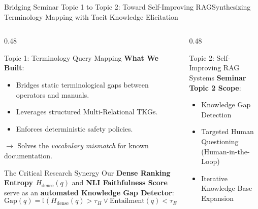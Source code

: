 \documentclass[aspectratio=169,10pt]{beamer}
\begin{document}
\begin{frame}{Bridging Seminar Topic 1 to Topic 2: Toward Self-Improving RAG}{Synthesizing Terminology Mapping with Tacit Knowledge Elicitation}
  \begin{columns}[T]
    \begin{column}{0.48\textwidth}
      \begin{block}{Topic 1: Terminology Query Mapping}
        \scriptsize
        \textbf{What We Built}:
        \begin{itemize}\setlength\itemsep{0.03ex}
          \item Bridges static terminological gaps between operators and manuals.
          \item Leverages structured Multi-Relational TKGs.
          \item Enforces deterministic safety policies.
        \end{itemize}
        $\rightarrow$ Solves the \textit{vocabulary mismatch} for known documentation.
      \end{block}

      \begin{exampleblock}{The Critical Research Synergy}
        \scriptsize
        Our \textbf{Dense Ranking Entropy $H_{\text{dense}}(q)$} and \textbf{NLI Faithfulness Score} serve as an \textbf{automated Knowledge Gap Detector}:
        \begin{equation*}
          \text{Gap}(q) = \mathbb{I}(H_{\text{dense}}(q) > \tau_H \lor \text{Entailment}(q) < \tau_E)
        \end{equation*}
      \end{exampleblock}
    \end{column}

    \begin{column}{0.48\textwidth}
      \begin{block}{Topic 2: Self-Improving RAG Systems}
        \scriptsize
        \textbf{Seminar Topic 2 Scope}:
        \begin{itemize}\setlength\itemsep{0.03ex}
          \item Knowledge Gap Detection
          \item Targeted Human Questioning (Human-in-the-Loop)
          \item Iterative Knowledge Base Expansion
        \end{itemize}
      \end{block}


\end{column}
\end{columns}
\end{frame}
\end{document}
